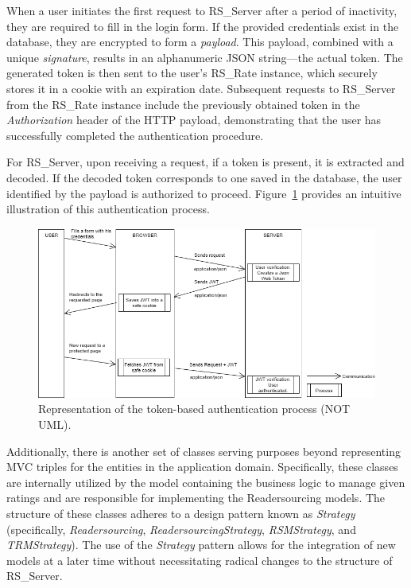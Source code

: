 \documentclass[a4paper, english]{article}
\newcommand{\rsserver}{RS\_Server\xspace}
\newcommand{\rsrate}{RS\_Rate\xspace}
\begin{document}
When a user initiates the first request to \rsserver after a period of inactivity, they are required to fill in the login form. If the provided credentials exist in the database, they are encrypted to form a \emph{payload}. This payload, combined with a unique \emph{signature}, results in an alphanumeric JSON string—the actual token. The generated token is then sent to the user's \rsrate instance, which securely stores it in a cookie with an expiration date. Subsequent requests to \rsserver from the \rsrate instance include the previously obtained token in the \emph{Authorization} header of the HTTP payload, demonstrating that the user has successfully completed the authentication procedure.

For \rsserver, upon receiving a request, if a token is present, it is extracted and decoded. If the decoded token corresponds to one saved in the database, the user identified by the payload is authorized to proceed. Figure~\ref{fig:auth} provides an intuitive illustration of this authentication process.

\begin{figure}[!tbp]
\centering
\includegraphics[width=\textwidth]{figures/autenticazione.png}
\caption{Representation of the token-based authentication process (NOT UML).}
\label{fig:auth}
\end{figure}

Additionally, there is another set of classes serving purposes beyond representing MVC triples for the entities in the application domain. Specifically, these classes are internally utilized by the model containing the business logic to manage given ratings and are responsible for implementing the Readersourcing models. The structure of these classes adheres to a design pattern known as \emph{Strategy} (specifically, \emph{Readersourcing}, \emph{ReadersourcingStrategy}, \emph{RSMStrategy}, and \emph{TRMStrategy}). The use of the \emph{Strategy} pattern allows for the integration of new models at a later time without necessitating radical changes to the structure of \rsserver.
\end{document}
